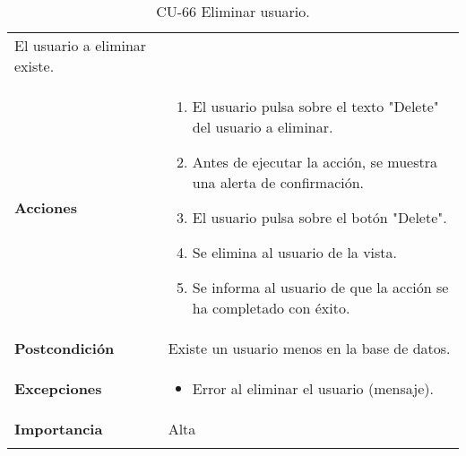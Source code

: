 \begin{longtable}[]{@{}ll@{}}
\begin{minipage}[t]{0.68\columnwidth}
El usuario a eliminar existe.\strut
\end{minipage}\tabularnewline
\begin{minipage}[t]{0.26\columnwidth}\raggedright
\textbf{Acciones}\strut
\end{minipage} & \begin{minipage}[t]{0.68\columnwidth}\raggedright
\begin{enumerate}
\def\labelenumi{\arabic{enumi}.}
\tightlist
\item
  El usuario pulsa sobre el texto "Delete" del usuario a eliminar.
\item
  Antes de ejecutar la acción, se muestra una alerta de confirmación.
\item
  El usuario pulsa sobre el botón "Delete".
\item
  Se elimina al usuario de la vista.
\item
  Se informa al usuario de que la acción se ha completado con éxito.
\end{enumerate}\strut
\end{minipage}\tabularnewline
\begin{minipage}[t]{0.26\columnwidth}\raggedright
\textbf{Postcondición}\strut
\end{minipage} & \begin{minipage}[t]{0.68\columnwidth}\raggedright
Existe un usuario menos en la base de datos.\strut
\end{minipage}\tabularnewline
\begin{minipage}[t]{0.26\columnwidth}\raggedright
\textbf{Excepciones}\strut
\end{minipage} & \begin{minipage}[t]{0.68\columnwidth}\raggedright
\begin{itemize}
\tightlist
\item
  Error al eliminar el usuario (mensaje).
\end{itemize}\strut
\end{minipage}\tabularnewline
\begin{minipage}[t]{0.26\columnwidth}\raggedright
\textbf{Importancia}\strut
\end{minipage} & \begin{minipage}[t]{0.68\columnwidth}\raggedright
Alta\strut
\end{minipage}\tabularnewline
\bottomrule
\caption{CU-66 Eliminar usuario.}
\end{longtable}

